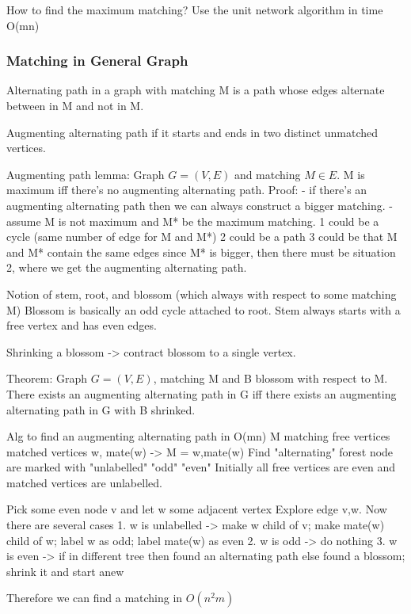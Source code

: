 How to find the maximum matching?  Use the unit network algorithm in time
O(m\sqrt n)

\subsubsection{Matching in General Graph}
Alternating path in a graph with matching M is a path whose edges alternate
between in M and not in M.

Augmenting alternating path if it starts and ends in two distinct unmatched
vertices.

Augmenting path lemma:
Graph $G=(V,E)$ and matching $M\in E$.  M is maximum iff there's no augmenting
alternating path.
Proof: 
- if there's an augmenting alternating path then we can always construct a bigger matching.
- assume M is not maximum and M* be the maximum matching.
	1 could be a cycle (same number of edge for M and M*)
	2 could be a path
	3 could be that M and M* contain the same edges
  since M* is bigger, then there must be situation 2, where we get the augmenting alternating path.

Notion of stem, root, and blossom (which always with respect to some matching M)
Blossom is basically an odd cycle attached to root.
Stem always starts with a free vertex and has even edges.

Shrinking a blossom -> contract blossom to a single vertex.

Theorem:
Graph $G=(V,E)$, matching M and B blossom with respect to M.  There exists an
augmenting alternating path in G iff there exists an augmenting alternating
path in G with B shrinked.

Alg to find an augmenting alternating path in O(mn)
M matching
free vertices
matched vertices w, mate(w) -> M = {w,mate(w)}
Find "alternating" forest
	node are marked with "unlabelled" "odd" "even"
Initially all free vertices are even and matched vertices are unlabelled.

Pick some even node v and let w some adjacent vertex
Explore edge {v,w}.  Now there are several cases
1. w is unlabelled -> make w child of v; make mate(w) child of w; label w as odd; label mate(w) as even
2. w is odd -> do nothing
3. w is even -> if in different tree then found an alternating path
		else found a blossom; shrink it and start anew

Therefore we can find a matching in $O(n^2m)$

